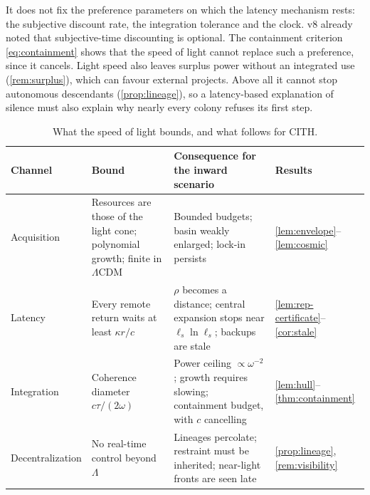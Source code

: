 \documentclass[11pt,a4paper]{article}
\theoremstyle{definition}
\newcommand{\CITH}{\textsc{CITH}}
\newcommand{\ls}{\ell_s}
\begin{document}
It does not fix the preference parameters on which the latency mechanism
rests: the subjective discount rate, the integration tolerance and the clock.
v8 already noted that subjective-time discounting is optional. The
containment criterion \cref{eq:containment} shows that the speed of light
cannot replace such a preference, since it cancels. Light speed also leaves
surplus power without an integrated use (\cref{rem:surplus}), which can favour
external projects. Above all it cannot stop autonomous descendants
(\cref{prop:lineage}), so a latency-based explanation of silence must also
explain why nearly every colony refuses its first step.

\begin{table}[tbp]
\centering\small
\caption{What the speed of light bounds, and what follows for \CITH.}
\label{tab:summary}
\begin{tabularx}{\textwidth}{@{}p{}YYp{.1\textwidth}@{}}\toprule
Channel & Bound & Consequence for the inward scenario & Results\\\midrule
Acquisition & Resources are those of the light cone; polynomial growth;
finite in $\Lambda$CDM & Bounded budgets; basin weakly enlarged; lock-in persists
& \ref{lem:envelope}--\ref{lem:cosmic}\\
Latency & Every remote return waits at least $\kappa r/c$ &
$\rho$ becomes a distance; central expansion stops near $\ls\ln\ls$; backups are stale &
\ref{lem:rep-certificate}--\ref{cor:stale}\\
Integration & Coherence diameter $c\tau/(2\omega)$ &
Power ceiling $\propto\omega^{-2}$; growth requires slowing; containment budget, with $c$ cancelling &
\ref{lem:hull}--\ref{thm:containment}\\
Decentralization & No real-time control beyond $\Lambda$ &
Lineages percolate; restraint must be inherited; near-light fronts are seen late &
\ref{prop:lineage}, \ref{rem:visibility}\\\bottomrule
\end{tabularx}
\end{table}
\end{document}
